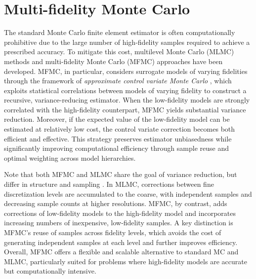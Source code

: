 \section{Multi-fidelity Monte Carlo}\label{sec:MFMC}
The standard Monte Carlo finite element estimator is often computationally prohibitive due to the large number of high-fidelity samples required to achieve a prescribed accuracy. To mitigate this cost, multilevel Monte Carlo (MLMC) methods \cite{Gi:2008,Gi:2015} and multi-fidelity Monte Carlo (MFMC) approaches \cite{PeWiGu:2016} have been developed. MFMC,  in particular, considers surrogate models of varying fidelities through the framework of {\it approximate control variate Monte Carlo} \cite{GoGeElJa:2020}, which exploits statistical 
correlations between models of varying fidelity to construct a recursive, variance-reducing estimator. When the low-fidelity models are strongly correlated with the high-fidelity counterpart, MFMC yields substantial variance reduction. Moreover, if the expected value of the low-fidelity model can be estimated at relatively low cost, the control variate correction becomes both efficient and effective. This strategy preserves estimator unbiasedness while significantly improving computational efficiency through sample reuse and optimal weighting across model hierarchies. 



Note that both MFMC and MLMC share the goal of variance reduction, but differ in structure and sampling \cite{ArGuMoWi:2025,PeGuWi:2018}. In MLMC, corrections between fine discretization levels are accumulated to the coarse, with independent samples and decreasing sample counts at higher resolutions. MFMC, by contrast, adds corrections of low-fidelity models to the high-fidelity model and incorporates increasing numbers of inexpensive, low-fidelity samples. A key distinction is MFMC’s reuse of samples across fidelity levels, which avoids the cost of generating independent samples at each level and further improves efficiency. Overall, MFMC offers a flexible and scalable alternative to standard MC and MLMC, particularly suited for problems where high-fidelity models are accurate but computationally intensive.


